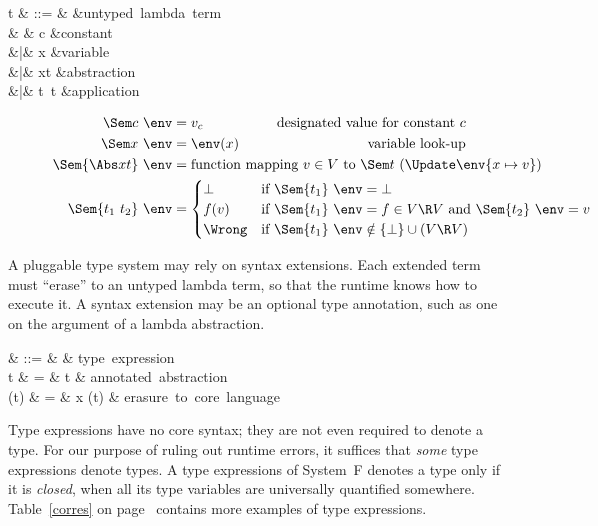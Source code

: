 \documentclass{amsart}
\begin{document}
\begin{syntax}
t & ::= & &\mbox{untyped lambda term} \\
& & c &\mbox{constant} \\
&|& x &\mbox{variable} \\
&|& \Abs xt &\mbox{abstraction} \\
&|& t~t &\mbox{application}
\end{syntax}
%
\begin{align*}
\Sem c~\env &= v_c & \mbox{designated value for constant }c\\
\Sem x~\env &= \env(x) & \mbox{variable look-up}\\
\Sem{\Abs x t}~\env &=
\rlap{function mapping $v\in V$ to $\Sem t~(\Update\env{x\mapsto v})$}\\
\Sem{t_1~t_2}~\env &=
\begin{cases}
\bot&\rlap{if $\Sem{t_1}~\env=\bot$}\\
f(v)&\rlap{if $\Sem{t_1}~\env=f\in V\R V$ and $\Sem{t_2}~\env=v$}\\
\Wrong&\rlap{if $\Sem{t_1}~\env\notin \{\bot\}\cup(V\R V)$}
\end{cases}
\end{align*}

A pluggable type system may rely on syntax extensions. Each
extended term must ``erase'' to an untyped lambda term, so that
the runtime knows how to execute it. A syntax extension may be an
optional type annotation, such as one on the argument of a lambda
abstraction.
\begin{syntax}
\sigma & ::= & \cdots & \mbox{type expression}\\
t & \+= & t & \mbox{annotated abstraction}\\
\Erase(t) & = & \Abs x \Erase(t) &
\mbox{erasure to core language}
\end{syntax}

Type expressions have no core syntax; they are not even required
to denote a type. For our purpose of ruling out runtime errors,
it suffices that \emph{some} type expressions denote types. A
type expressions of System~F denotes a type only if it is
\emph{closed}, when all its type variables are universally
quantified somewhere. Table~\ref{corres} on page~\pageref{corres}
contains more examples of type expressions.
\end{document}
